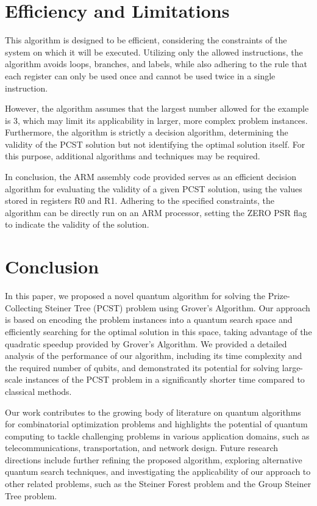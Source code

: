 \section{Efficiency and Limitations}

This algorithm is designed to be efficient, considering the constraints of the system on which it will be executed. Utilizing only the allowed instructions, the algorithm avoids loops, branches, and labels, while also adhering to the rule that each register can only be used once and cannot be used twice in a single instruction.

However, the algorithm assumes that the largest number allowed for the example is 3, which may limit its applicability in larger, more complex problem instances. Furthermore, the algorithm is strictly a decision algorithm, determining the validity of the PCST solution but not identifying the optimal solution itself. For this purpose, additional algorithms and techniques may be required.

In conclusion, the ARM assembly code provided serves as an efficient decision algorithm for evaluating the validity of a given PCST solution, using the values stored in registers R0 and R1. Adhering to the specified constraints, the algorithm can be directly run on an ARM processor, setting the ZERO PSR flag to indicate the validity of the solution.

\section{Conclusion}
\label{sec:conclusion}

In this paper, we proposed a novel quantum algorithm for solving the Prize-Collecting Steiner Tree (PCST) problem using Grover's Algorithm. Our approach is based on encoding the problem instances into a quantum search space and efficiently searching for the optimal solution in this space, taking advantage of the quadratic speedup provided by Grover's Algorithm. We provided a detailed analysis of the performance of our algorithm, including its time complexity and the required number of qubits, and demonstrated its potential for solving large-scale instances of the PCST problem in a significantly shorter time compared to classical methods.

Our work contributes to the growing body of literature on quantum algorithms for combinatorial optimization problems and highlights the potential of quantum computing to tackle challenging problems in various application domains, such as telecommunications, transportation, and network design. Future research directions include further refining the proposed algorithm, exploring alternative quantum search techniques, and investigating the applicability of our approach to other related problems, such as the Steiner Forest problem and the Group Steiner Tree problem.


